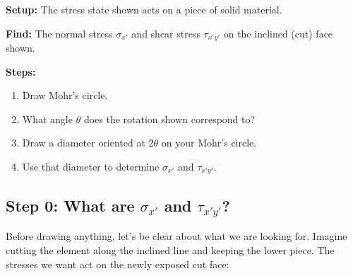 \documentclass[11pt]{article}
\begin{document}
\noindent
\begin{minipage}[c]{0.55\textwidth}
\textbf{Setup:} The stress state shown acts on a piece of solid material.

\smallskip
\textbf{Find:} The normal stress $\sigma_{x'}$ and shear stress $\tau_{x'y'}$ on the
inclined (cut) face shown.

\smallskip
\textbf{Steps:}
\begin{enumerate}[itemsep=1pt]
  \item Draw Mohr's circle.
  \item What angle $\theta$ does the rotation shown correspond to?
  \item Draw a diameter oriented at $2\theta$ on your Mohr's circle.
  \item Use that diameter to determine $\sigma_{x'}$ and $\tau_{x'y'}$.
\end{enumerate}
\end{minipage}%
\hfill
\begin{minipage}[c]{0.42\textwidth}
\centering
{}
\end{minipage}

\subsection*{Step 0: What are $\sigma_{x'}$ and $\tau_{x'y'}$?}

\noindent
Before drawing anything, let's be clear about what we are looking for. Imagine cutting the
element along the inclined line and keeping the lower piece. The stresses we want act on
the newly exposed cut face:
\end{document}
